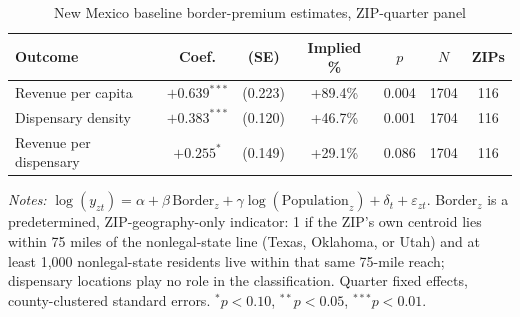 \begin{table}[htbp]
\centering
\caption{New Mexico baseline border-premium estimates, ZIP-quarter panel}
\label{tab:nm_baseline}
\footnotesize
\begin{tabular}{lcccccc}
\toprule
Outcome & Coef. & (SE) & Implied \% & $p$ & $N$ & ZIPs \\
\midrule
Revenue per capita & $+0.639^{***}$ & (0.223) & +89.4\% & 0.004 & 1704 & 116 \\
Dispensary density & $+0.383^{***}$ & (0.120) & +46.7\% & 0.001 & 1704 & 116 \\
Revenue per dispensary & $+0.255^{*}$ & (0.149) & +29.1\% & 0.086 & 1704 & 116 \\
\bottomrule
\end{tabular}
\begin{minipage}{0.98\textwidth}
\vspace{0.3em}
\footnotesize
\textit{Notes:} $\log(y_{zt}) = \alpha + \beta\,\text{Border}_z + \gamma\log(\text{Population}_z) + \delta_t + \varepsilon_{zt}$.
Border$_z$ is a predetermined, ZIP-geography-only indicator: 1 if the ZIP's own centroid lies within 75 miles of the
nonlegal-state line (Texas, Oklahoma, or Utah) and at least 1,000 nonlegal-state residents live within that same
75-mile reach; dispensary locations play no role in the classification. Quarter fixed effects, county-clustered
standard errors. $^{*}p<0.10$, $^{**}p<0.05$, $^{***}p<0.01$.
\end{minipage}
\end{table}

